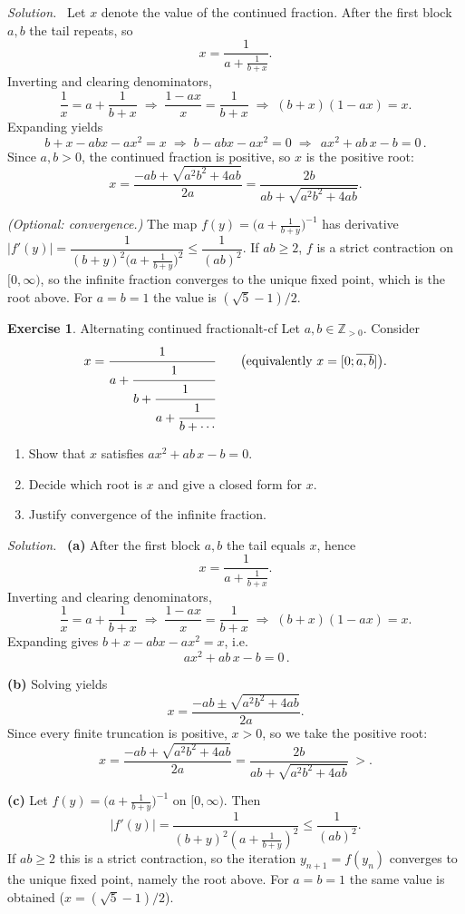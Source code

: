 \documentclass[11pt,a4paper]{article}
\theoremstyle{definition}
\newtheorem{exercise}{Exercise} %
\theoremstyle{definition}
\theoremstyle{plain}
\theoremstyle{remark}
\newenvironment{solution}{\par\noindent\textit{Solution.}\ }{\par\vspace{0.5em}}
\begin{document}
\begin{solution}
	Let $x$ denote the value of the continued fraction. After the first block $a,b$ the tail repeats, so
	\[
	x=\frac{1}{a+\frac{1}{b+x}}.
	\]
	Inverting and clearing denominators,
	\[
	\frac{1}{x}=a+\frac{1}{b+x}
	\;\Longrightarrow\;
	\frac{1-ax}{x}=\frac{1}{b+x}
	\;\Longrightarrow\;
	(b+x)(1-ax)=x.
	\]
	Expanding yields
	\[
	b+x-abx-a x^2=x
	\;\Longrightarrow\;
	b-abx-a x^2=0
	\;\Longrightarrow\;
	\boxed{\,a x^2+ab\,x-b=0\,}.
	\]
	Since $a,b>0$, the continued fraction is positive, so $x$ is the positive root:
	\[
	x=\frac{-ab+\sqrt{a^2b^2+4ab}}{2a}
	=\frac{2b}{ab+\sqrt{a^2b^2+4ab}}.
	\]
	
	\emph{(Optional: convergence.)}
	The map $f(y)=\bigl(a+\frac{1}{b+y}\bigr)^{-1}$ has derivative
	\(
	|f'(y)|=\dfrac{1}{(b+y)^2\bigl(a+\frac{1}{b+y}\bigr)^2}\le \dfrac{1}{(ab)^2}.
	\)
	If $ab\ge2$, $f$ is a strict contraction on $[0,\infty)$, so the infinite fraction converges to the unique fixed point, which is the root above. For $a=b=1$ the value is $(\sqrt5-1)/2$.
\end{solution}

\begin{exercise}{Alternating continued fraction}{alt-cf}
	Let $a,b\in\mathbb Z_{>0}$. Consider
	\[
	x=\cfrac{1}{\displaystyle a+\cfrac{1}{\displaystyle b+\cfrac{1}{\displaystyle a+\cfrac{1}{\displaystyle b+\cdots}}}}
	\qquad\bigl(\text{equivalently }x=[0;\overline{a,b}]\bigr).
	\]
	\begin{enumerate}
		\item[(a)] Show that $x$ satisfies $a x^{2}+ab\,x-b=0$.
		\item[(b)] Decide which root is $x$ and give a closed form for $x$.
		\item[(c)] Justify convergence of the infinite fraction.
	\end{enumerate}
\end{exercise}

\begin{solution}
	\textbf{(a)} After the first block $a,b$ the tail equals $x$, hence
	\[
	x=\frac{1}{a+\frac{1}{b+x}}.
	\]
	Inverting and clearing denominators,
	\[
	\frac{1}{x}=a+\frac{1}{b+x}
	\;\Longrightarrow\;
	\frac{1-ax}{x}=\frac{1}{b+x}
	\;\Longrightarrow\;
	(b+x)(1-ax)=x.
	\]
	Expanding gives $b+x-abx-a x^2=x$, i.e.
	\[
	\boxed{\,a x^2+ab\,x-b=0\,}.
	\]
	
	\medskip
	\textbf{(b)} Solving yields
	\[
	x=\frac{-ab\pm\sqrt{a^2b^2+4ab}}{2a}.
	\]
	Since every finite truncation is positive, $x>0$, so we take the positive root:
	\[
	\boxed{\;
		x=\frac{-ab+\sqrt{a^2b^2+4ab}}{2a}
		=\frac{2b}{ab+\sqrt{a^2b^2+4ab}}\;>.
		\;}
	\]
	
	\medskip
	\textbf{(c)} Let $f(y)=\bigl(a+\frac{1}{b+y}\bigr)^{-1}$ on $[0,\infty)$. Then
	\[
	|f'(y)|=\frac{1}{(b+y)^2\left(a+\frac{1}{b+y}\right)^2}\le \frac{1}{(ab)^2}.
	\]
	If $ab\ge2$ this is a strict contraction, so the iteration $y_{n+1}=f(y_n)$ converges to the unique fixed point, namely the root above. For $a=b=1$ the same value is obtained ($x=(\sqrt5-1)/2$).
\end{solution}
\end{document}
